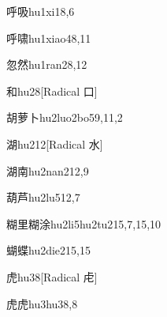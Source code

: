 \begin{entry}{呼吸}{hu1xi1}{8,6}
\end{entry}

\begin{entry}{呼啸}{hu1xiao4}{8,11}
\end{entry}

\begin{entry}{忽然}{hu1ran2}{8,12}
\end{entry}

\begin{entry}{和}{hu2}{8}[Radical 口]
\end{entry}

\begin{entry}{胡萝卜}{hu2luo2bo5}{9,11,2}
\end{entry}

\begin{entry}{湖}{hu2}{12}[Radical 水]
\end{entry}

\begin{entry}{湖南}{hu2nan2}{12,9}
\end{entry}

\begin{entry}{葫芦}{hu2lu5}{12,7}
\end{entry}

\begin{entry}{糊里糊涂}{hu2li5hu2tu2}{15,7,15,10}
\end{entry}

\begin{entry}{蝴蝶}{hu2die2}{15,15}
\end{entry}

\begin{entry}{虎}{hu3}{8}[Radical ⾌]
\end{entry}

\begin{entry}{虎虎}{hu3hu3}{8,8}
\end{entry}

